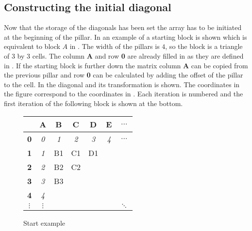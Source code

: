 


\subsection{Constructing the initial diagonal} \label{section:initial}
Now that the storage of the diagonals has been set the array has to be initiated at the beginning of the pillar.
In  an example of a starting block is shown which is equivalent to block $A$ in .
The width of the pillars is $4$, so the block is a triangle of $3$ by $3$ cells.
The column \textbf{A} and row \textbf{0} are already filled in as they are defined in .
If the starting block is further down the matrix column \textbf{A} can be copied from the previous pillar and row \textbf{0} can be calculated by adding the offset of the pillar to the cell.
In  the diagonal and its transformation is shown.
The coordinates in the figure correspond to the coordinates in .
Each iteration is numbered and the first iteration of the following block is shown at the bottom.

{\newcommand\C[0]{\cellcolor{gray}}
\begin{figure}
\centering \large
\begin{tabular}{|c|c||c|c|c|c||c} \hline
           & \textbf{A} & \textbf{B} & \textbf{C} & \textbf{D} & \textbf{E} & $\dotsc$ \\ \hline
\textbf{0} & \textit{0} & \textit{1} & \textit{2} & \textit{3} & \textit{4} & $\dotsc$ \\ \hline \hline
\textbf{1} & \textit{1} & B1         & C1         & D1         & \C         &          \\ \hline
\textbf{2} & \textit{2} & B2         & C2         & \C         & \C         &          \\ \hline
\textbf{3} & \textit{3} & B3         & \C         & \C         & \C         &          \\ \hline
\textbf{4} & \textit{4} & \C         & \C         & \C         & \C         &          \\ \hline
$\vdots$   & $\vdots$   & \C         & \C         & \C         & \C         & $\ddots$ \\
\end{tabular}
\caption{Start example} \label{tstart}
\end{figure}
}

